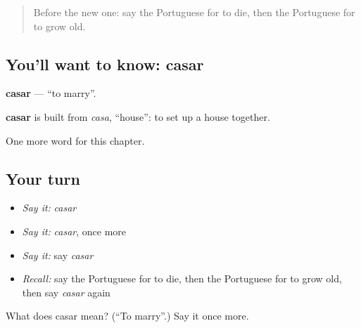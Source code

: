 \begin{quote}
Before the new one: say the Portuguese for to die, then the Portuguese for to grow old.
\end{quote}

\subsection*{You'll want to know: casar}
\textbf{casar} — \textquotedblleft{}to marry\textquotedblright{}.

\begin{cousinweb}
\textbf{casar} is built from \emph{casa}, \textquotedblleft{}house\textquotedblright{}: to set up a house together.
\end{cousinweb}

\begin{grammarlens}[title={What you've built}]
One more word for this chapter.
\end{grammarlens}

\subsection*{Your turn}
\begin{itemize}
\raggedright
  \item \emph{Say it:} \emph{casar}
  \item \emph{Say it:} \emph{casar}, once more
  \item \emph{Say it:} say \emph{casar}
  \item \emph{Recall:} say the Portuguese for to die, then the Portuguese for to grow old, then say \emph{casar} again
\end{itemize}

\begin{tcolorbox}[breakable,colback=teal!4,colframe=teal!35!black,title={Before you move on}]
What does casar mean? (\textquotedblleft{}To marry\textquotedblright{}.) Say it once more.
\end{tcolorbox}

